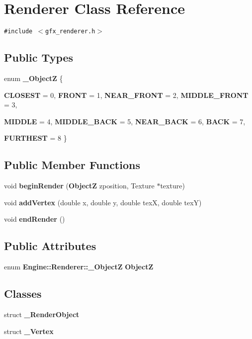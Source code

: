 \section{Renderer Class Reference}
\label{classEngine_1_1Renderer}
{\tt \#include $<$gfx\_\-renderer.h$>$}

\subsection*{Public Types}
\begin{CompactItemize}
\item 
enum {\bf \_\-ObjectZ} \{ \par
\textbf{CLOSEST} =  0, 
\textbf{FRONT} =  1, 
\textbf{NEAR\_\-FRONT} =  2, 
\textbf{MIDDLE\_\-FRONT} =  3, 
\par
\textbf{MIDDLE} =  4, 
\textbf{MIDDLE\_\-BACK} =  5, 
\textbf{NEAR\_\-BACK} =  6, 
\textbf{BACK} =  7, 
\par
\textbf{FURTHEST} =  8
 \}
\end{CompactItemize}
\subsection*{Public Member Functions}
\begin{CompactItemize}
\item 
void {\bf beginRender} ({\bf ObjectZ} zposition, Texture $\ast$texture)
\item 
void {\bf addVertex} (double x, double y, double texX, double texY)
\item 
void \textbf{endRender} ()\label{classEngine_1_1Renderer_ee7f73b7269cbbf181d92553f2b8f8f0}

\end{CompactItemize}
\subsection*{Public Attributes}
\begin{CompactItemize}
\item 
enum {\bf Engine::Renderer::\_\-ObjectZ} {\bf ObjectZ}
\end{CompactItemize}
\subsection*{Classes}
\begin{CompactItemize}
\item 
struct \textbf{\_\-RenderObject}
\item 
struct \textbf{\_\-Vertex}
\end{CompactItemize}


